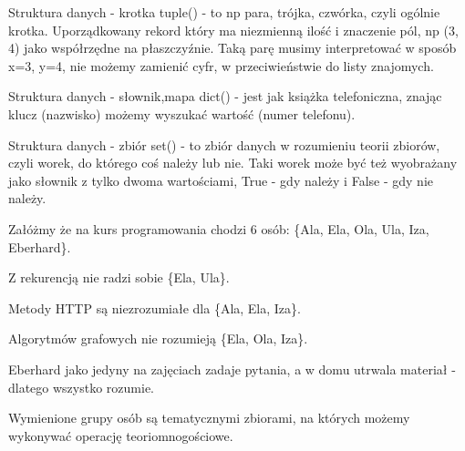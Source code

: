 \begin{frame}{Struktura danych - krotka}
    tuple() - to np para, trójka, czwórka, czyli ogólnie krotka. Uporządkowany rekord
    który ma niezmienną ilość i znaczenie pól, np (3, 4) jako współrzędne na płaszczyźnie.
    Taką parę musimy interpretować w sposób x=3, y=4, nie możemy zamienić cyfr, w przeciwieństwie
    do listy znajomych.
\end{frame}
\begin{frame}{Struktura danych - słownik,mapa}
    dict() - jest jak książka telefoniczna, znając klucz
    (nazwisko) możemy wyszukać wartość (numer telefonu).
\end{frame}
\begin{frame}{Struktura danych - zbiór}
    set() - to zbiór danych w rozumieniu teorii zbiorów, czyli worek, do którego coś należy lub nie.
    Taki worek może być też wyobrażany jako słownik z tylko dwoma wartościami, True - gdy należy
    i False - gdy nie należy.

    Załóżmy że na kurs programowania chodzi 6 osób: \{Ala, Ela, Ola, Ula, Iza, Eberhard\}.

    Z rekurencją nie radzi sobie \{Ela, Ula\}.

    Metody HTTP są niezrozumiałe dla \{Ala, Ela, Iza\}.

    Algorytmów grafowych nie rozumieją \{Ela, Ola, Iza\}.

    Eberhard jako jedyny na zajęciach zadaje pytania, a w domu utrwala materiał - dlatego wszystko rozumie.

    Wymienione grupy osób są tematycznymi zbiorami, na których możemy wykonywać operację teoriomnogościowe.
\end{frame}

